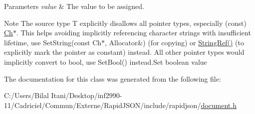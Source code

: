 \begin{DoxyParams}{Parameters}
{\em value} & The value to be assigned.\\
\hline
\end{DoxyParams}
\begin{DoxyNote}{Note}
The source type {\ttfamily T} explicitly disallows all pointer types, especially ({\ttfamily const}) \hyperlink{class_generic_value_ade0e0ce64ccd5d852da57a35e720bafb}{Ch}$\ast$. This helps avoiding implicitly referencing character strings with insufficient lifetime, use Set\+String(const Ch$\ast$, Allocator\&) (for copying) or \hyperlink{document_8h_aa6b9fd9f6aa49405a574c362ba9af6b5}{String\+Ref()} (to explicitly mark the pointer as constant) instead. All other pointer types would implicitly convert to {\ttfamily bool}, use Set\+Bool() instead.\+Set boolean value 
\end{DoxyNote}


The documentation for this class was generated from the following file\+:\begin{DoxyCompactItemize}
\item 
C\+:/\+Users/\+Bilal Itani/\+Desktop/inf2990-\/11/\+Cadriciel/\+Commun/\+Externe/\+Rapid\+J\+S\+O\+N/include/rapidjson/\hyperlink{document_8h}{document.\+h}\end{DoxyCompactItemize}
